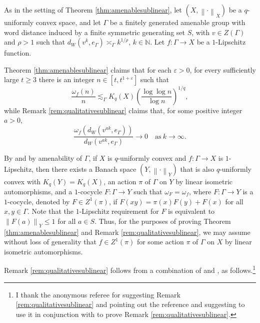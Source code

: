 \documentclass[11pt,reqno]{amsart}
\newcommand{\1}{\mathbf 1}
\begin{document}
As in the setting of Theorem \ref{thm:amenablesublinear}, let $\left(X,\left\|\cdot\right\|_X\right)$ be a $q$-uniformly convex space, and let $\Gamma$ be a finitely generated amenable group with word distance induced by a finite symmetric generating set $S$, with $v\in Z\left(\Gamma\right)$ and $\rho>1$ such that $d_W\left(v^k,e_\Gamma\right)\asymp_\Gamma k^{1/\rho}$, $k\in \mathbb{N}$. Let $f:\Gamma\to X$ be a $1$-Lipschitz function.

Theorem \ref{thm:amenablesublinear} claims that for each $\varepsilon>0$, for every sufficiently large $t\ge 3$ there is an integer $n\in \left[t,t^{1+\varepsilon}\right]$ such that
\[
\frac{\omega_f\left(n\right)}{n}\lesssim_\Gamma K_q\left(X\right)\left(\frac{\log \log n}{\log n}\right)^{1/q},
\]
while Remark \ref{rem:qualitativesublinear} claims that, for some positive integer $a>0$,
\[
\frac{\omega_f\left(d_W\left(v^{ak},e_\Gamma\right)\right)}{d_W\left(v^{ak},e_\Gamma\right)}\to 0\quad \mathrm{as}~k\to\infty.
\]

By \cite[Theorem 9.1]{naor2011lp} and by amenability of $\Gamma$, if $X$ is $q$-uniformly convex and $f:\Gamma\to X$ is $1$-Lipschitz, then there exists a Banach space $\left(Y,\left\|\cdot\right\|_Y\right)$ that is also $q$-uniformly convex with $K_q\left(Y\right)=K_q\left(X\right)$, an action $\pi$ of $\Gamma$ on $Y$ by linear isometric automorphisms, and a $1$-cocycle $F:\Gamma\to Y$ such that $\omega_F=\omega_f$, where $F:\Gamma\to Y$ is a $1$-cocycle, denoted by $F\in Z^1\left(\pi\right)$, if $F\left(xy\right)=\pi\left(x\right)F\left(y\right)+F\left(x\right)$ for all $x,y\in \Gamma$. Note that the $1$-Lipschitz requirement for $F$ is equivalent to $\left\|F\left(a\right)\right\|_Y\le 1$ for all $a\in S$. Thus, for the purposes of proving Theorem \ref{thm:amenablesublinear} and Remark \ref{rem:qualitativesublinear}, we may assume without loss of generality that $f\in Z^1\left(\pi\right)$ for some action $\pi$ of $\Gamma$ on $X$ by linear isometric automorphisms.

Remark \ref{rem:qualitativesublinear} follows from a combination of \cite[Proposition 3.5]{das2016integrable} and \cite{naor2011lp}, as follows.\footnote{I thank the anonymous referee for suggesting Remark \ref{rem:qualitativesublinear} and pointing out the reference \cite[Proposition 3.5]{das2016integrable} and suggesting to use it in conjunction with \cite{naor2011lp} to prove Remark \ref{rem:qualitativesublinear}.}
\end{document}
